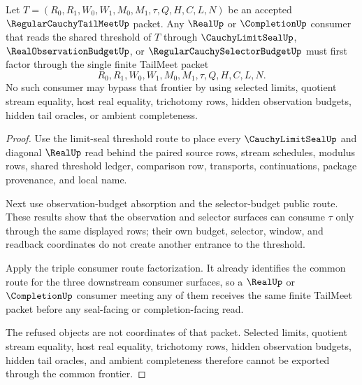 \begin{theorem}
\label{thm:regular-cauchy-tail-meet-real-completion-consumer-frontier}
Let $T=(R_0,R_1,W_0,W_1,M_0,M_1,\tau,Q,H,C,L,N)$ be an accepted $\RegularCauchyTailMeetUp$ packet. Any $\RealUp$ or $\CompletionUp$ consumer that reads the shared threshold of $T$ through $\CauchyLimitSealUp$, $\RealObservationBudgetUp$, or $\RegularCauchySelectorBudgetUp$ must first factor through the single finite TailMeet packet
$$
R_0,R_1,W_0,W_1,M_0,M_1,\tau,Q,H,C,L,N.
$$
No such consumer may bypass that frontier by using selected limits, quotient stream equality, host real equality, trichotomy rows, hidden observation budgets, hidden tail oracles, or ambient completeness.
\end{theorem}
\begin{proof}
Use the limit-seal threshold route to place every $\CauchyLimitSealUp$ and diagonal $\RealUp$ read behind the paired source rows, stream schedules, modulus rows, shared threshold ledger, comparison row, transports, continuations, package provenance, and local name.

Next use observation-budget absorption and the selector-budget public route. These results show that the observation and selector surfaces can consume $\tau$ only through the same displayed rows; their own budget, selector, window, and readback coordinates do not create another entrance to the threshold.

Apply the triple consumer route factorization. It already identifies the common route for the three downstream consumer surfaces, so a $\RealUp$ or $\CompletionUp$ consumer meeting any of them receives the same finite TailMeet packet before any seal-facing or completion-facing read.

The refused objects are not coordinates of that packet. Selected limits, quotient stream equality, host real equality, trichotomy rows, hidden observation budgets, hidden tail oracles, and ambient completeness therefore cannot be exported through the common frontier.
\end{proof}

